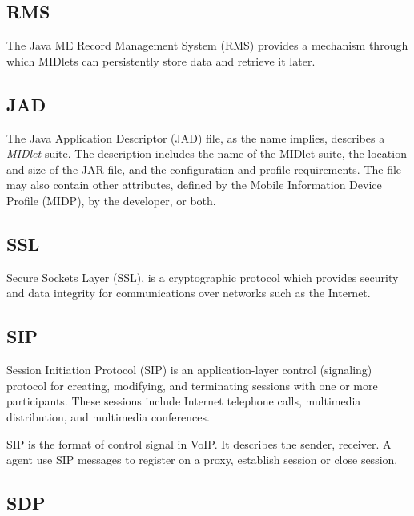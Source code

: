 \subsection*{RMS}
\label{sec:RMS}
\label{sym:RMS}
The Java ME Record Management System (RMS) provides a mechanism through which MIDlets can persistently store data and retrieve it later.\cite{J2MERecordManagementStore}

\subsection*{JAD}
\label{sec:JAD}
\label{sym:JAD}

The Java Application Descriptor (JAD) file, as the name implies, describes a \textit{MIDlet} suite. The description includes the name of the MIDlet suite, the location and size of the JAR file, and the configuration and profile requirements. The file may also contain other attributes, defined by the Mobile Information Device Profile (MIDP), by the developer, or both.\cite{LearningPathMIDletLifeCycle}


\subsection*{SSL}
\label{sec:SSL}
\label{sym:SSL}

Secure Sockets Layer (SSL), is a cryptographic protocol which provides security and data integrity for communications over networks such as the Internet.\cite{SSL}


\subsection*{SIP}
\label{sec:SIP}
\label{sym:SIP}

Session Initiation Protocol (SIP) is an application-layer control (signaling) protocol for creating, modifying, and terminating sessions with one or more participants. These sessions include Internet telephone calls, multimedia distribution, and multimedia conferences.\cite{RFC3261}

SIP is the format of control signal in VoIP. It describes the sender, receiver. A agent use SIP messages to register on a proxy, establish session or close session. 

\subsection*{SDP}
\label{sec:SDP}
\label{sym:SDP}

